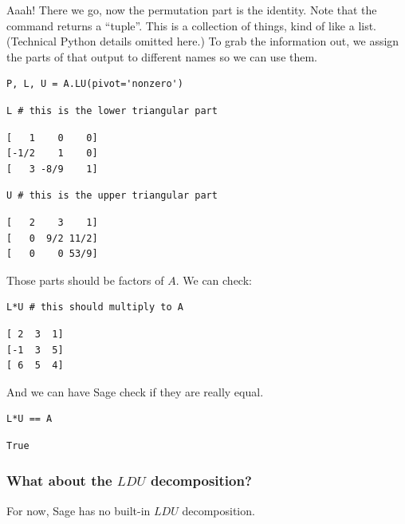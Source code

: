 \documentclass[10pt,]{book}
\theoremstyle{plain}
\numberwithin{equation}{section}
\begin{document}
        Aaah! There we go, now the permutation part is the identity. Note that
        the command returns a ``tuple''. This is a collection of things,
        kind of like a list. (Technical Python details omitted here.)
        To grab the information out, we assign the parts of that output to different
        names so we can use them.
\begin{lstlisting}[style=sageinput]
P, L, U = A.LU(pivot='nonzero')
\end{lstlisting}
\begin{lstlisting}[style=sageinput]
L # this is the lower triangular part
\end{lstlisting}
\begin{lstlisting}[style=sageoutput]
[   1    0    0]
[-1/2    1    0]
[   3 -8/9    1]
\end{lstlisting}
\begin{lstlisting}[style=sageinput]
U # this is the upper triangular part
\end{lstlisting}
\begin{lstlisting}[style=sageoutput]
[   2    3    1]
[   0  9/2 11/2]
[   0    0 53/9]
\end{lstlisting}
\par

        Those parts should be factors of \(A\). We can check:
\begin{lstlisting}[style=sageinput]
L*U # this should multiply to A
\end{lstlisting}
\begin{lstlisting}[style=sageoutput]
[ 2  3  1]
[-1  3  5]
[ 6  5  4]
\end{lstlisting}
\par

        And we can have Sage check if they are really equal.
\begin{lstlisting}[style=sageinput]
L*U == A
\end{lstlisting}
\begin{lstlisting}[style=sageoutput]
True
\end{lstlisting}
\typeout{************************************************}
\typeout{************************************************}
\subsubsection[What about the \(LDU\) decomposition?]{What about the \(LDU\) decomposition?}\label{subsubsection-27}
For now, Sage has no built-in \(LDU\) decomposition.%
\typeout{************************************************}
\typeout{************************************************}
\end{document}
